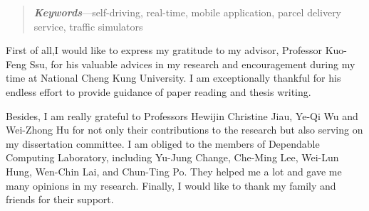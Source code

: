 \documentclass[12pt]{ksthesis}
\begin{document}
\begin{preliminary}
\begin{abstract}
\emph{\textbf{Keywords}}---self-driving, real-time, mobile application, parcel delivery service, traffic simulators

\end{abstract}

\begin{acknowledgements}
\Thesisspace {\large }

First of all,I would like to express my gratitude to my advisor, Professor Kuo-Feng Ssu, for his valuable advices in my research and encouragement during my time at National Cheng Kung University. I am exceptionally thankful for his endless effort to provide guidance of paper reading and thesis writing. 

Besides, I am really grateful to Professors Hewijin Christine Jiau, Ye-Qi Wu and Wei-Zhong Hu for not only their contributions to the research but also serving on my dissertation committee. I am obliged to the members of Dependable Computing Laboratory, including Yu-Jung Change, Che-Ming Lee, Wei-Lun Hung, Wen-Chin Lai, and Chun-Ting Po. They helped me a lot and gave me many opinions in my research. Finally, I would like to thank my family and friends for their support. 

\end{acknowledgements}
\tableofcontents \listoffigures \listoftables \clearpage

\end{preliminary}
\end{document}
